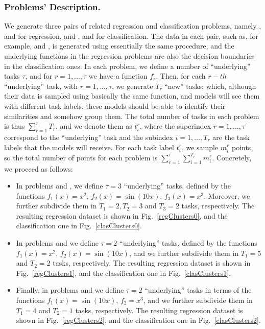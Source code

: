 \subsubsection*{Problems' Description.}
We generate three pairs of related regression and classification problems, namely ,  and  for regression, and ,  and  for classification.
The data in each pair, such as, for example,  and , is generated using essentially the same procedure, and the underlying functions in the regression problems are also the decision boundaries in the classification ones.
%
In each problem, we define a number of ``underlying'' tasks $\tau$, and for $r=1, \ldots, \tau$ we have a function $f_r$.
Then, for each $r-th$ ``underlying'' task, with $r=1, \ldots, \tau$, we generate $T_r$ ``new'' tasks; which, although their data is sampled using basically the same function, and models will see them with different task labels, these models should be able to identify their similarities and somehow group them.
%
The total number of tasks in each problem is thus $\sum_{r=1}^{\tau} T_r$, and we denote them as $t_i^r$, where the superindex $r=1, \ldots, \tau$ correspond to the ``underlying'' task and the subindex $i=1, \ldots, T_r$ are the task labels that the models will receive.
%
For each task label $t_i^r$, we sample $m_i^r$ points, so the total number of points for each problem is $\sum_{r=1}^\tau \sum_{i=1}^{T_r} m_i^r$.
%
Concretely, we proceed as follows:
\begin{itemize}
    \item In problems  and , we define $\tau=3$ ``underlying'' tasks, defined by the functions $f_1(x) = x^2$,  $f_2(x) = \sin(10x)$, $f_3(x) = x^3$. Moreover, we further subdivide them in $T_1 = 2, T_2 = 3$ and $T_3 = 2$ tasks, respectively. The resulting regression dataset is shown in Fig.~\ref{regClusters0}, and the classification one in Fig.~\ref{clasClusters0}. 
    \item In problems  and  we define $\tau=2$ ``underlying'' tasks, defined by the functions $f_1(x) = x^2$,  $f_2(x) = \sin(10x)$, and we further subdivide them in
    $T_1 = 5$ and $T_2 = 2$ tasks, respectively. The resulting regression dataset is shown in Fig.~\ref{regClusters1}, and the classification one in Fig.~\ref{clasClusters1}. 
    \item Finally, in problems  and  we define $\tau=2$ ``underlying'' tasks in terms of the functions $f_1(x) = \sin(10x)$, $f_2 = x^3$, and we further subdivide them in
    $T_1 = 4$ and $T_2 = 1$ tasks, respectively. The resulting regression dataset is shown in Fig.~\ref{regClusters2}, and the classification one in Fig.~\ref{clasClusters2}.
\end{itemize}
